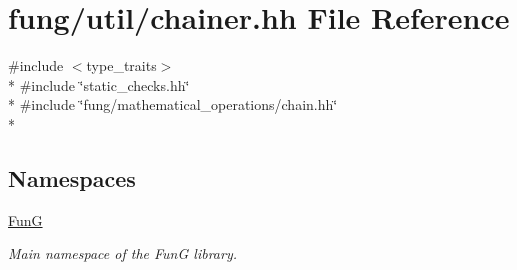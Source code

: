 \hypertarget{chainer_8hh}{}\section{fung/util/chainer.hh File Reference}
\label{chainer_8hh}
{\ttfamily \#include $<$type\+\_\+traits$>$}\\*
{\ttfamily \#include \char`\"{}static\+\_\+checks.\+hh\char`\"{}}\\*
{\ttfamily \#include \char`\"{}fung/mathematical\+\_\+operations/chain.\+hh\char`\"{}}\\*
\subsection*{Namespaces}
\begin{DoxyCompactItemize}
\item 
 \hyperlink{namespaceFunG}{Fun\+G}
\begin{DoxyCompactList}\small\item\em Main namespace of the Fun\+G library. \end{DoxyCompactList}\end{DoxyCompactItemize}
